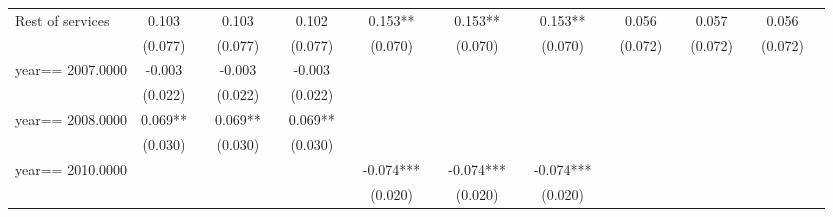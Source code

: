 \begin{table}[htbp]
\begin{tabular}{l*{18}{c}}
Rest of services    &       0.103   &               &       0.103   &               &       0.102   &               &       0.153** &               &       0.153** &               &       0.153** &               &       0.056   &               &       0.057   &               &       0.056   &               \\
                    &     (0.077)   &               &     (0.077)   &               &     (0.077)   &               &     (0.070)   &               &     (0.070)   &               &     (0.070)   &               &     (0.072)   &               &     (0.072)   &               &     (0.072)   &               \\
year==  2007.0000   &      -0.003   &               &      -0.003   &               &      -0.003   &               &               &               &               &               &               &               &               &               &               &               &               &               \\
                    &     (0.022)   &               &     (0.022)   &               &     (0.022)   &               &               &               &               &               &               &               &               &               &               &               &               &               \\
year==  2008.0000   &       0.069** &               &       0.069** &               &       0.069** &               &               &               &               &               &               &               &               &               &               &               &               &               \\
                    &     (0.030)   &               &     (0.030)   &               &     (0.030)   &               &               &               &               &               &               &               &               &               &               &               &               &               \\
year==  2010.0000   &               &               &               &               &               &               &      -0.074***&               &      -0.074***&               &      -0.074***&               &               &               &               &               &               &               \\
                    &               &               &               &               &               &               &     (0.020)   &               &     (0.020)   &               &     (0.020)   &               &               &               &               &               &               &               \\

\end{tabular}
\end{table}
